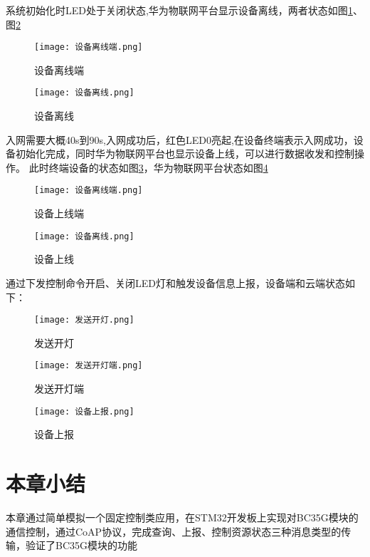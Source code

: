 系统初始化时LED处于关闭状态,华为物联网平台显示设备离线，两者状态如图\ref{设备离线端}、图\ref{设备离线}

\begin{figure}[H]
    \centering
	\texttt{[image: 设备离线端.png]}
	\caption{设备离线端}
	\label{设备离线端}
\end{figure}


\begin{figure}[H]
    \centering
	\texttt{[image: 设备离线.png]}
	\caption{设备离线}
	\label{设备离线}
\end{figure}

入网需要大概40s到90s,入网成功后，红色LED0亮起,在设备终端表示入网成功，设备初始化完成，同时华为物联网平台也显示设备上线，可以进行数据收发和控制操作。
此时终端设备的状态如图\ref{设备上线端}，华为物联网平台状态如图\ref{设备上线}
\begin{figure}[H]
    \centering
	\texttt{[image: 设备离线端.png]}
	\caption{设备上线端}
	\label{设备上线端}
\end{figure}


\begin{figure}[H]
    \centering
	\texttt{[image: 设备离线.png]}
	\caption{设备上线}
	\label{设备上线}
\end{figure}

通过下发控制命令开启、关闭LED灯和触发设备信息上报，设备端和云端状态如下：
\begin{figure}[H]
    \centering
	\texttt{[image: 发送开灯.png]}
	\caption{发送开灯}
	\label{发送开灯}
\end{figure}


\begin{figure}[H]
    \centering
	\texttt{[image: 发送开灯端.png]}
	\caption{发送开灯端}
	\label{发送开灯端}

\end{figure}\begin{figure}[H]
    \centering
	\texttt{[image: 设备上报.png]}
	\caption{设备上报}
	\label{设备上报}
\end{figure}

\section{本章小结}

本章通过简单模拟一个固定控制类应用，在STM32开发板上实现对BC35G模块的通信控制，通过CoAP协议，完成查询、上报、控制资源状态三种消息类型的传输，验证了BC35G模块的功能